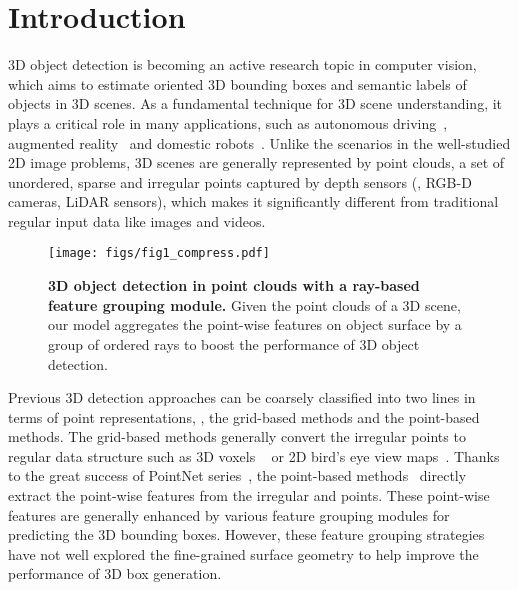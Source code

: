 \documentclass[final]{cvpr}
\begin{document}
\section{Introduction} \label{sec:intro}
3D object detection is becoming an active research topic in computer vision, which aims to estimate oriented 3D bounding boxes and semantic labels of objects in 3D scenes. As a fundamental technique for 3D scene understanding, it plays a critical role in many applications, such as autonomous driving~\cite{bansal2018chauffeurnet, wang2019monocular}, augmented reality~\cite{azuma1997survey,billinghurst2015survey} and domestic robots~\cite{zhu2017target, wang2021collaborative}. 
Unlike the scenarios in the well-studied 2D image problems, 
3D scenes are generally represented by point clouds, a set of unordered, sparse and irregular points captured by depth sensors (\eg, RGB-D cameras, LiDAR sensors), which makes it significantly different from traditional regular input data like images and videos. 
\begin{figure}[t]
  \centering
   \texttt{[image: figs/fig1\_compress.pdf]}
   \vspace{-6pt}
   \caption{\textbf{3D object detection in point clouds with a ray-based feature grouping module.} Given the point clouds of a 3D scene, our model aggregates the point-wise features on object surface by a group of ordered rays to boost the performance of 3D object detection.}
   \label{fig:fig1}
   \vspace{-12pt}
\end{figure}


Previous 3D detection approaches can be coarsely classified into two lines in terms of point representations, \ie, the grid-based methods and the point-based methods. The grid-based methods generally convert the irregular points to regular data structure such as 3D voxels ~\cite{song2016deep,shi2020points,yan2018second,zhou2018voxelnet,shi2020pv,yin2021cvpr, Deng2021VoxelRT} or 2D bird's eye view maps~\cite{chen2017multi, ku2018joint, liang2019multi, yang2018hdnet, yang2018pixor}. 
Thanks to the great success of PointNet series~\cite{qi2017pointnet,qi2018pointnnetplus}, the point-based methods~\cite{qi2018frustum, shi2019pointrcnn, qi2019deep, zhang2020h3dnet, liu2021group, cheng2021back} directly extract the point-wise features from the irregular and points. These point-wise features are generally enhanced by various feature grouping modules for predicting the 3D bounding boxes. 
However, these feature grouping strategies have not well explored the fine-grained surface geometry to help improve the performance of 3D box generation. 
\end{document}
